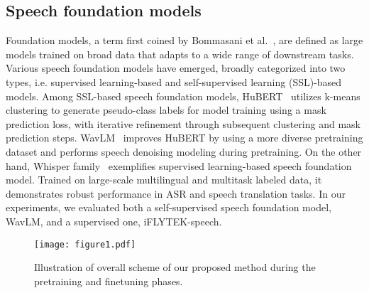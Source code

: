  
\subsection{Speech foundation models}

Foundation models, a term first coined by Bommasani et al.~\cite{Bommasani2021FoundationModels}, are defined as large models trained on broad data that adapts to a wide range of downstream tasks. Various speech foundation models have emerged, broadly categorized into two types, i.e. supervised learning-based and self-supervised learning (SSL)-based models.
Among SSL-based speech foundation models, 
HuBERT~\cite{hsu2021hubert}  utilizes k-means clustering to generate pseudo-class labels for model training using a mask prediction loss,
with iterative refinement through subsequent clustering and mask prediction steps.
WavLM~\cite{hsu2021hubert} improves HuBERT by using a more diverse pretraining dataset and performs speech denoising modeling during pretraining.
On the other hand, Whisper family~\cite{radford2023robust} exemplifies  supervised learning-based speech foundation model. Trained on large-scale multilingual and multitask labeled data, it demonstrates robust performance in ASR and speech translation tasks. 
In our experiments, we evaluated both a self-supervised speech foundation model, WavLM, and a supervised one, iFLYTEK-speech.

\begin{figure}
    \centering
    \texttt{[image: figure1.pdf]}
    \caption{Illustration of  overall scheme of our proposed method during the pretraining and finetuning phases.}
    \label{fig:figure1}
\end{figure}
